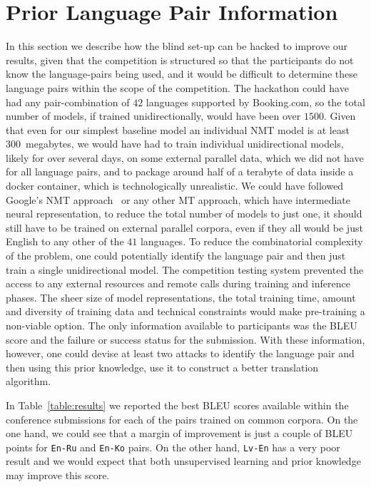 \documentclass[]{article}
\begin{document}
\section{Prior Language Pair Information}
\label{sect:non_blind}

In this section we describe how the blind set-up can be hacked to improve our results, given that the competition is structured so that the participants do not know the language-pairs being used, and it would be difficult to determine these language pairs within the scope of the competition.
The hackathon could have had any pair-combination of $42$ languages supported by {{Booking.com}}, so the total number of models, if trained unidirectionally, would have been over $1500$.
Given that even for our simplest baseline model an individual \ac{NMT} model is at least $300$~megabytes, we would have had to train individual unidirectional models, likely for over several days, on some external parallel data, which we did not have for all language pairs, and to package around half of a terabyte of data inside a docker container, which is technologically unrealistic.
We could have followed Google's \ac{NMT} approach~\citep{johnson2016google} or any other \ac{MT} approach, which have intermediate neural representation, to reduce the total number of models to just one, it should still have to be trained on external parallel corpora, even if they all would be just English to any other of the $41$ languages.
To reduce the combinatorial complexity of the problem, one could potentially identify the language pair and then just train a single unidirectional model.
The competition testing system prevented the access to any external resources and remote calls during training and inference phases.
The sheer size of model representations, the total training time, amount and diversity of training data and technical constraints would make pre-training a non-viable option.
The only information available to participants was the BLEU score and the failure or success status for the submission.
With these information, however, one could devise at least two attacks to identify the language pair and then using this prior knowledge, use it to construct a better translation algorithm.

In Table~\ref{table:results} we reported the best BLEU scores available within the conference submissions for each of the pairs trained on common corpora.
On the one hand, we could see that a margin of improvement is just a couple of BLEU points for {\tt En-Ru} and {\tt En-Ko} pairs.
On the other hand, {\tt Lv-En} has a very poor result and we would expect that both unsupervised learning and prior knowledge may improve this score.
\end{document}
